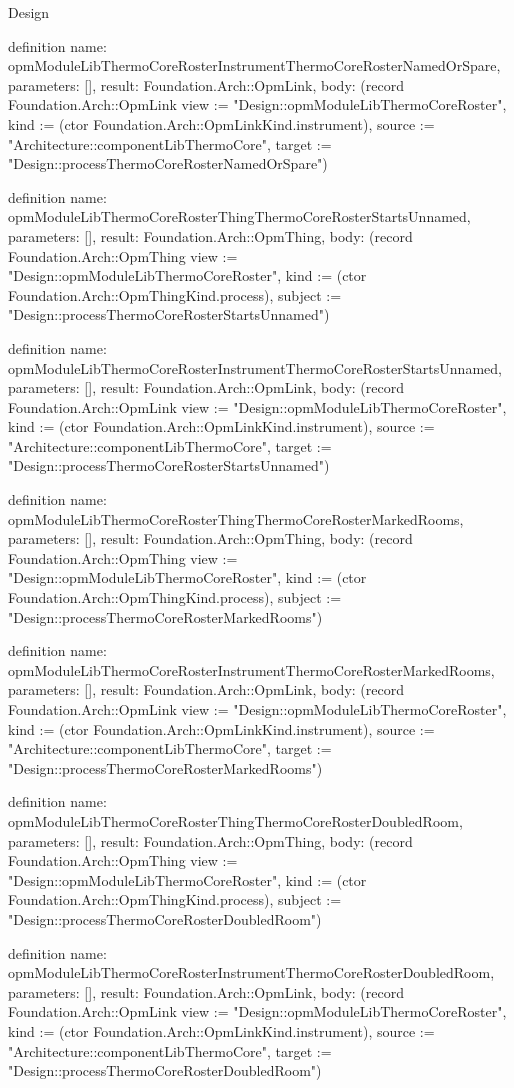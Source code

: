 \begin{lexlean}{Design}
\begin{semanticmodule}
definition{
  name: opmModuleLibThermoCoreRosterInstrumentThermoCoreRosterNamedOrSpare,
  parameters: [],
  result: Foundation.Arch::OpmLink,
  body: (record Foundation.Arch::OpmLink {view := "Design::opmModuleLibThermoCoreRoster", kind := (ctor Foundation.Arch::OpmLinkKind.instrument), source := "Architecture::componentLibThermoCore", target := "Design::processThermoCoreRosterNamedOrSpare"})
}

definition{
  name: opmModuleLibThermoCoreRosterThingThermoCoreRosterStartsUnnamed,
  parameters: [],
  result: Foundation.Arch::OpmThing,
  body: (record Foundation.Arch::OpmThing {view := "Design::opmModuleLibThermoCoreRoster", kind := (ctor Foundation.Arch::OpmThingKind.process), subject := "Design::processThermoCoreRosterStartsUnnamed"})
}

definition{
  name: opmModuleLibThermoCoreRosterInstrumentThermoCoreRosterStartsUnnamed,
  parameters: [],
  result: Foundation.Arch::OpmLink,
  body: (record Foundation.Arch::OpmLink {view := "Design::opmModuleLibThermoCoreRoster", kind := (ctor Foundation.Arch::OpmLinkKind.instrument), source := "Architecture::componentLibThermoCore", target := "Design::processThermoCoreRosterStartsUnnamed"})
}

definition{
  name: opmModuleLibThermoCoreRosterThingThermoCoreRosterMarkedRooms,
  parameters: [],
  result: Foundation.Arch::OpmThing,
  body: (record Foundation.Arch::OpmThing {view := "Design::opmModuleLibThermoCoreRoster", kind := (ctor Foundation.Arch::OpmThingKind.process), subject := "Design::processThermoCoreRosterMarkedRooms"})
}

definition{
  name: opmModuleLibThermoCoreRosterInstrumentThermoCoreRosterMarkedRooms,
  parameters: [],
  result: Foundation.Arch::OpmLink,
  body: (record Foundation.Arch::OpmLink {view := "Design::opmModuleLibThermoCoreRoster", kind := (ctor Foundation.Arch::OpmLinkKind.instrument), source := "Architecture::componentLibThermoCore", target := "Design::processThermoCoreRosterMarkedRooms"})
}

definition{
  name: opmModuleLibThermoCoreRosterThingThermoCoreRosterDoubledRoom,
  parameters: [],
  result: Foundation.Arch::OpmThing,
  body: (record Foundation.Arch::OpmThing {view := "Design::opmModuleLibThermoCoreRoster", kind := (ctor Foundation.Arch::OpmThingKind.process), subject := "Design::processThermoCoreRosterDoubledRoom"})
}

definition{
  name: opmModuleLibThermoCoreRosterInstrumentThermoCoreRosterDoubledRoom,
  parameters: [],
  result: Foundation.Arch::OpmLink,
  body: (record Foundation.Arch::OpmLink {view := "Design::opmModuleLibThermoCoreRoster", kind := (ctor Foundation.Arch::OpmLinkKind.instrument), source := "Architecture::componentLibThermoCore", target := "Design::processThermoCoreRosterDoubledRoom"})
}


\end{semanticmodule}
\end{lexlean}
